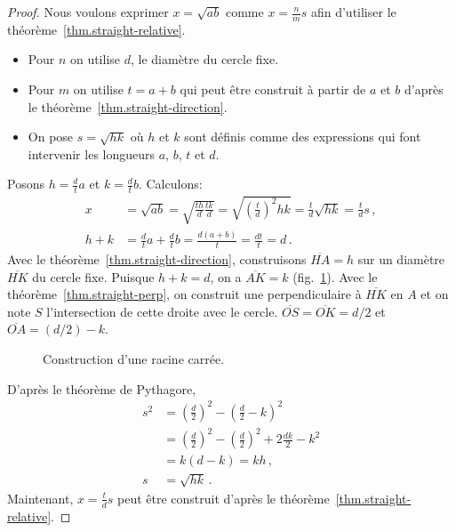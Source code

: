 \begin{proof}
Nous voulons exprimer $x=\sqrt{ab}$ comme $x=\displaystyle\frac{n}{m}s$ afin d'utiliser le théorème~\ref{thm.straight-relative}.
\begin{itemize}
\setlength{\itemsep}{0pt}
\item Pour $n$ on utilise $d$, le diamètre du cercle fixe.
\item Pour $m$ on utilise $t=a+b$ qui peut être construit à partir de $a$ et $b$ d'après le théorème~\ref{thm.straight-direction}.
\item On pose $s=\sqrt{hk}$ où $h$ et $k$ sont définis comme des expressions qui font intervenir  les longueurs $a$, $b$, $t$ et $d$.
\end{itemize}
Posons $h=\displaystyle\frac{d}{t}a$ et $k=\displaystyle\frac{d}{t}b$. Calculons:
\begin{align*}
x&=\sqrt{ab}=\sqrt{\frac{th}{d}\frac{tk}{d}}=\sqrt{\left(\frac{t}{d}\right)^2hk}=\frac{t}{d}\sqrt{hk}=\frac{t}{d}s\,,\\
h+k &= \frac{d}{t}a + \frac{d}{t}b = \frac{d(a+b)}{t} = \frac{dt}{t} = d\,.
\end{align*}
Avec le théorème~\ref{thm.straight-direction}, construisons $\overline{HA}= h$ sur un diamètre $\overline{HK}$ du cercle fixe. Puisque $h+k=d$, on a $\overline{AK}=k$ (fig.~\ref{f.se-sqrt}). Avec le théorème~\ref{thm.straight-perp}, on construit une perpendiculaire à $\overline{HK}$ en $A$ et on note $S$ l'intersection de cette droite avec le cercle. $\overline{OS}=\overline{OK}=d/2$ et $\overline{OA}=(d/2)-k$. 
\begin{figure}[htbp]
\centering
{}
\caption{Construction d'une racine carrée.}\label{f.se-sqrt}
\end{figure}

D'après le théorème de Pythagore,
\begin{align*}
s^2&= \left(\frac{d}{2}\right)^2 - \left(\frac{d}{2}-k\right)^2\\
&= \left(\frac{d}{2}\right)^2 - \left(\frac{d}{2}\right)^2 + 2\frac{dk}{2} - k^2\\
&= k(d-k) = kh\,,\\
s&=\sqrt{hk}\,.
\end{align*}
Maintenant, $x=\displaystyle\frac{t}{d}s$ peut être construit d'après le théorème~\ref{thm.straight-relative}.
\end{proof}

